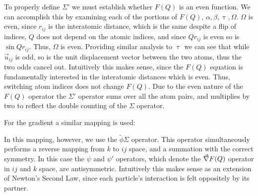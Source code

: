 To properly define $\Sigma'$ we must establish whether $F(Q)$ is an even function.
We can accomplish this by examining each of the portions of $F(Q)$, $\alpha, \beta ,\uptau, \Omega$.
$\Omega$ is even, since $r_{ij}$ is the interatomic distance, which is the same despite a flip of indices, $Q$ does not depend on the atomic indices, and since $Qr_{ij}$ is even so is $\sin{Qr_{ij}}$.  Thus, $\Omega$ is even.  Providing similar analysis to $\uptau$ we can see that while $\vec{u}_{ij}$ is odd, so is the unit displacement vector between the two atoms, thus the two odds cancel out.
Intuitively this makes sense, since the $F(Q)$ equation is fundamentally interested in the interatomic distances which is even.  Thus, switching atom indices does not change $F(Q)$.
Due to the even nature of the $F(Q)$ operator the $\Sigma'$ operator sums over all the atom pairs, and multiplies by two to reflect the double counting of the $\Sigma$ operator.

For the gradient a similar mapping is used:
\begin{figure}[h!]
\begin{center}
\end{center}
\end{figure}

In this mapping, however, we use the $\tilde{\phi}\Sigma$ operator.  This operator simultaneously performs a reverse mapping from $k$ to $ij$ space, and a summation with the correct symmetry.  In this case the $\psi$ and $\psi'$ operators, which denote the $\vec{\nabla} F(Q)$ operator in $ij$ and $k$ space, are antisymmetric.  Intuitively this makes sense as an extension of Newton's Second Law, since each particle's interaction is felt oppositely by its partner.
